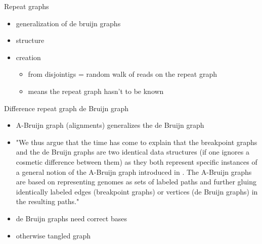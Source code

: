 \documentclass{beamer}
\begin{document}
  \begin{frame}{Repeat graphs}
    \begin{itemize}
      \item generalization of de bruijn graphs

      \item structure

      \item creation
      
      \begin{itemize}

        \item from disjointigs = random walk of reads on the repeat graph 
      
        \item means the repeat graph hasn't to be known
      \end{itemize}
    \end{itemize}
  \end{frame}

  \begin{frame}{Difference repeat graph de Bruijn graph}
    \begin{itemize}
      \item A-Bruijn graph (alignments) generalizes the de Bruijn graph

      \item "We thus argue that the time has come to explain that the breakpoint graphs and the de Bruijn graphs are two identical data structures (if one ignores a cosmetic difference between them) as they both represent specific instances of a general notion of the A-Bruijn graph introduced in \cite{lin_what_2014}. The A-Bruijn graphs are based on representing genomes as sets of labeled paths and further gluing identically labeled edges (breakpoint graphs) or vertices (de Bruijn graphs) in the resulting paths." \cite{pevzner_novo_2004}

      \item de Bruijn graphs need correct bases
      
      \item otherwise tangled graph
    \end{itemize}
  \end{frame}
\end{document}
